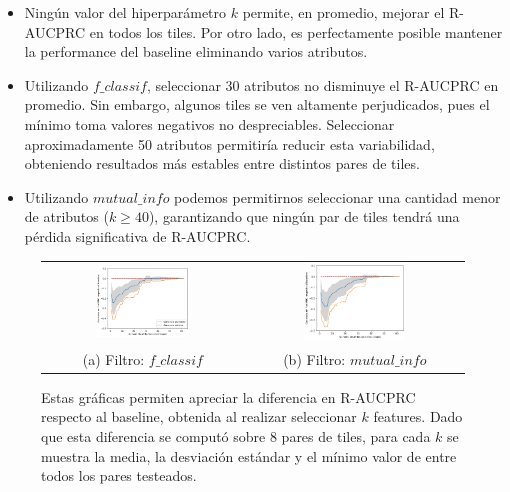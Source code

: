 \begin{itemize}
\item Ningún valor del hiperparámetro $k$ permite, en promedio, mejorar el R-AUCPRC en todos los tiles. Por otro lado, es perfectamente posible mantener la performance del baseline eliminando varios atributos.
\item Utilizando $f\_classif$, seleccionar 30 atributos no disminuye el R-AUCPRC en promedio. Sin embargo, algunos tiles se ven altamente perjudicados, pues el mínimo toma valores negativos no despreciables. Seleccionar aproximadamente 50 atributos permitiría reducir esta variabilidad, obteniendo resultados más estables entre distintos pares de tiles.
\item Utilizando $mutual\_info$ podemos permitirnos seleccionar una cantidad menor de atributos ($k \geq 40$), garantizando que ningún par de tiles tendrá una pérdida significativa de R-AUCPRC.
\end{itemize} 

\begin{figure}[h!]
\begin{tabular}{cc}
  \includegraphics[width=0.49\textwidth]{Kap5/linearBEST_K_f_classif.png} &   \includegraphics[width=0.49\textwidth]{Kap5/linearBEST_K_mutual_info_classif.png} \\
(a) Filtro: $f\_classif$ & (b) Filtro: $mutual\_info$
\end{tabular}
\caption{Estas gráficas permiten apreciar la diferencia en R-AUCPRC respecto al baseline, obtenida al realizar seleccionar $k$ features. Dado que esta diferencia se computó sobre 8 pares de tiles, para cada $k$ se muestra la media, la desviación estándar y el mínimo valor de entre todos los pares testeados. }
\label{fig:optimal_k_svml}
\end{figure}


